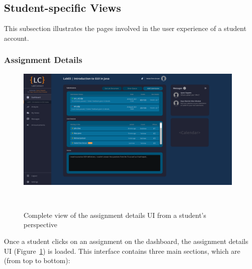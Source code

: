 \documentclass[a4paper, 12pt]{article}
\begin{document}
    
    \pagebreak
    
    
    \subsection{Student-specific Views}
    
    This subsection illustrates the pages involved in the user experience of a student account.
    
    \subsubsection{Assignment Details}
    
    \begin{figure}[H]
        \centering
        \includegraphics[width=\textwidth]{student_assignment_details}
        \caption{Complete view of the assignment details UI from a student's perspective}~\label{fig:student_assignment_details_full}
    \end{figure}

    Once a student clicks on an assignment on the dashboard, the assignment details UI (Figure~\ref{fig:student_assignment_details_full})
    is loaded. This interface contains three main sections, which are (from top to bottom):
\end{document}
